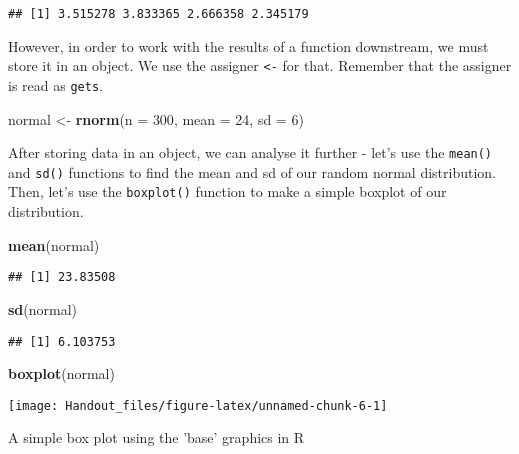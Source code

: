 \documentclass[]{tufte-handout}
\newenvironment{Shaded}{}{}
\newcommand{\DataTypeTok}[1]{\textcolor[rgb]{0.56,0.13,0.00}{#1}}
\newcommand{\DecValTok}[1]{\textcolor[rgb]{0.25,0.63,0.44}{#1}}
\newcommand{\KeywordTok}[1]{\textcolor[rgb]{0.00,0.44,0.13}{\textbf{#1}}}
\newcommand{\NormalTok}[1]{#1}
\newcommand{\StringTok}[1]{\textcolor[rgb]{0.25,0.44,0.63}{#1}}
\begin{document}
\begin{verbatim}
## [1] 3.515278 3.833365 2.666358 2.345179
\end{verbatim}

However, in order to work with the results of a function downstream, we
must store it in an object. We use the assigner \texttt{\textless{}-}
for that. Remember that the assigner is read as \texttt{gets}.

\begin{Shaded}
\begin{Highlighting}[]
\NormalTok{normal <-}\StringTok{ }\KeywordTok{rnorm}\NormalTok{(}\DataTypeTok{n =} \DecValTok{300}\NormalTok{, }\DataTypeTok{mean =} \DecValTok{24}\NormalTok{, }\DataTypeTok{sd =} \DecValTok{6}\NormalTok{)}
\end{Highlighting}
\end{Shaded}

After storing data in an object, we can analyse it further - let's use
the \texttt{mean()} and \texttt{sd()} functions to find the mean and sd
of our random normal distribution. Then, let's use the
\texttt{boxplot()} function to make a simple boxplot of our
distribution.

\begin{Shaded}
\begin{Highlighting}[]
\KeywordTok{mean}\NormalTok{(normal)}
\end{Highlighting}
\end{Shaded}

\begin{verbatim}
## [1] 23.83508
\end{verbatim}

\begin{Shaded}
\begin{Highlighting}[]
\KeywordTok{sd}\NormalTok{(normal)}
\end{Highlighting}
\end{Shaded}

\begin{verbatim}
## [1] 6.103753
\end{verbatim}

\begin{Shaded}
\begin{Highlighting}[]
\KeywordTok{boxplot}\NormalTok{(normal)}
\end{Highlighting}
\end{Shaded}

\begin{marginfigure}
\texttt{[image: Handout\_files/figure-latex/unnamed-chunk-6-1]} \caption[A simple box plot using the 'base' graphics in R]{A simple box plot using the 'base' graphics in R}\label{fig:unnamed-chunk-6}
\end{marginfigure}
\end{document}

